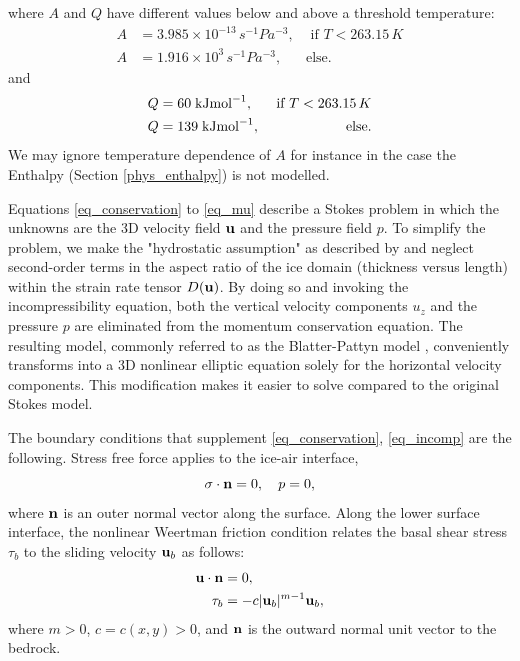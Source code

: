 \documentclass[gmd]{copernicus}
\begin{document}
where $A$ and $Q$ have different values below and above a threshold temperature:
\begin{align}
A & = 3.985 \times 10^{-13} \, s^{-1} Pa^{-3}, & \textrm{ if } T <263.15 \, K \label{A1} \\
A & = 1.916 \times 10^3 \, s^{-1} Pa^{-3}, & \textrm{else.} \label{A2} 
\end{align}
and
\begin{align}
Q & =  60 \; {\rm kJ mol}^{-1}, & \textrm{ if } T <263.15 \, K \\
Q & = 139 \; {\rm kJ mol}^{-1}, & \textrm{else.}
\end{align}
We may ignore temperature dependence of $A$ for instance in the case the Enthalpy (Section \ref{phys_enthalpy}) is not modelled.
 
Equations \eqref{eq_conservation} to \eqref{eq_mu} describe a Stokes problem in which the unknowns are the 3D velocity field ${\bf u}$ and the pressure field $p$. To simplify the problem, we make the "hydrostatic assumption" as described by  \citep{Blatter1995} and neglect second-order terms in the aspect ratio of the ice domain (thickness versus length) within the strain rate tensor $D({\bf u})$. By doing so and invoking the incompressibility equation, both the vertical velocity components $u_z$ and the pressure $p$ are eliminated from the momentum conservation equation. The resulting model, commonly referred to as the Blatter-Pattyn model \citep{Blatter1995}, conveniently transforms into a 3D nonlinear elliptic equation solely for the horizontal velocity components. This modification makes it easier to solve compared to the original Stokes model.

The boundary conditions that supplement \eqref{eq_conservation}, \eqref{eq_incomp} are the following. Stress free force applies to the ice-air interface,
\begin{equation}
\sigma \cdot {\bf n} = 0, \quad p = 0,  \label{BC_FS}
\end{equation}
where ${\bf n}$
is an outer normal vector along the surface. Along the lower surface interface, the nonlinear Weertman friction condition \citep[e.g.,][]{SchoofHewitt2013} relates the basal shear stress $\tau_b$ to the sliding velocity ${\bf u}_b$ as follows:
\begin{align}
{\bf u} \cdot {\bf n} &= 0,  \label{BC_slip1} \\ 
\tau_b & = -  c |{\bf u}_b|^{m-1} {\bf u}_b, \label{BC_slip2a}
\end{align} 
where $m>0$, $c=c(x,y) > 0$, and ${\bf n}$ is the outward normal unit vector to the bedrock.
\end{document}

